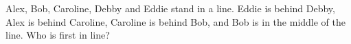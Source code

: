 Alex, Bob, Caroline, Debby and Eddie stand in a line. Eddie is behind Debby, Alex is behind Caroline, Caroline is behind Bob, and Bob is in the middle of the line. Who is first in line?
